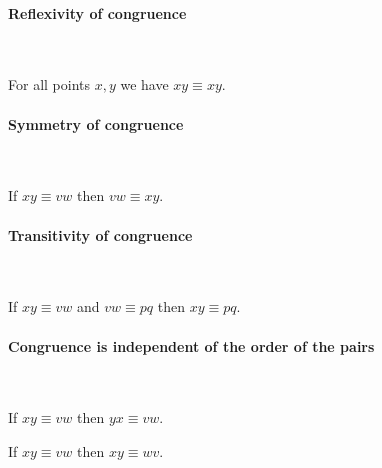 \documentclass[10pt,a4paper,parskip=half,numbers=endperiod,headings=standardclasses,parskip]{scrbook}
\newcommand{\Cong}[4]{#1 #2 \equiv #3 #4}
\begin{document}
  \paragraph{Reflexivity of congruence}\

  \begin{forthel}
    \begin{lemma} %
      For all points $x, y$ we have $\Cong{x}{y}{x}{y}$.
    \end{lemma}
  \end{forthel}


  \paragraph{Symmetry of congruence}\

  \begin{forthel}
    \begin{lemma} %
      If $\Cong{x}{y}{v}{w}$
      then $\Cong{v}{w}{x}{y}$.
    \end{lemma}
  \end{forthel}


  \paragraph{Transitivity of congruence}\

  \begin{forthel}
    \begin{lemma} %
      If $\Cong{x}{y}{v}{w}$ and $\Cong{v}{w}{p}{q}$
      then $\Cong{x}{y}{p}{q}$.
    \end{lemma}
  \end{forthel}


  \paragraph{Congruence is independent of the order of the pairs}\

  \begin{forthel}
    \begin{lemma} %
      If $\Cong{x}{y}{v}{w}$
      then $\Cong{y}{x}{v}{w}$.
    \end{lemma}

    \begin{lemma} %
      If $\Cong{x}{y}{v}{w}$
      then $\Cong{x}{y}{w}{v}$.
    \end{lemma}
  \end{forthel}
\end{document}
